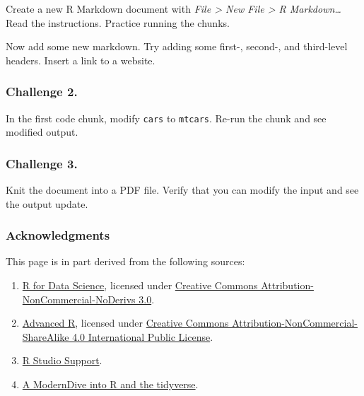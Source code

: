 \documentclass[
]{book}
\begin{document}
Create a new R Markdown document with \emph{File \textgreater{} New File \textgreater{} R Markdown\ldots{}} Read the instructions. Practice running the chunks.

Now add some new markdown. Try adding some first-, second-, and third-level headers. Insert a link to a website.

\hypertarget{challenge-2.}{%
\subsubsection*{Challenge 2.}\label{challenge-2.}}

In the first code chunk, modify \texttt{cars} to \texttt{mtcars}. Re-run the chunk and see modified output.

\hypertarget{challenge-3.}{%
\subsubsection*{Challenge 3.}\label{challenge-3.}}

Knit the document into a PDF file. Verify that you can modify the input and see the output update.

\hypertarget{acknowledgments-1}{%
\subsubsection*{Acknowledgments}\label{acknowledgments-1}}

This page is in part derived from the following sources:

\begin{enumerate}
\def\labelenumi{\arabic{enumi}.}
\item
  \href{https://r4ds.had.co.nz}{R for Data Science}, licensed under \href{https://creativecommons.org/licenses/by-nc-nd/3.0/us/}{Creative Commons Attribution-NonCommercial-NoDerivs 3.0}.
\item
  \href{https://adv-r.hadley.nz/}{Advanced R}, licensed under \href{https://creativecommons.org/licenses/by-nc-sa/4.0/}{Creative Commons Attribution-NonCommercial-ShareAlike 4.0 International Public License}.
\item
  \href{https://support.rstudio.com/hc/en-us/articles/200484448}{R Studio Support}.
\item
  \href{https://moderndive.netlify.com/1-getting-started.html}{A ModernDive into R and the tidyverse}.
\end{enumerate}
\end{document}
